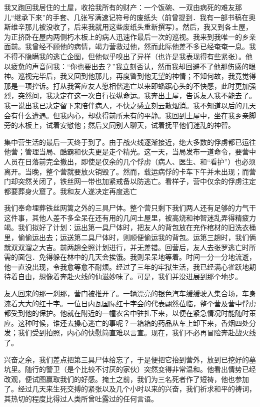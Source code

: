 \documentclass[11pt,oneside]{book}
\begin{document}
\begin{common-format}
我又跑回我居住的土屋，收拾我所有的财产：一个饭碗、一双由病死的难友那儿“继承下来”的手套、几张写满速记符号的废纸头（前曾提到．我有一部书稿在奥斯维辛那儿被没收了，后来我就用这些废纸头重新撰写）。然后，我又到各土屋，为正挤卧在屋内两侧朽木板上的病人迅速作最后一次的巡视。我来到我唯一的乡亲面前。我曾经不顾他的病情，竭力营救过他，然而此际他差不多已经奄奄一息。我不得不隐瞒我的逃亡企图，但他似乎嗅出了异样（也许是我表现得有些紧张）。他以疲惫的声音问我：“你也要出去？”我立刻否认，然而我却回避不了他那伤感的眼神。巡视完毕后，我又回到他那儿，再度瞥到他无望的神情；不知何故，我竟觉得那是一项控诉。打从我答应友人愿相偕逃亡以来即蟠踞心头的不快感，此时更加强烈，突然间，我决定在这一次自行操纵命运。我奔出土屋，告诉友人我不能去了。我一说出我已决定留下来陪伴病人，不快之感立刻云散烟消。我不知道以后的几天会有什么遭遇。但我内心，却获得前所未有的平静。我回到土屋中，坐在我乡亲脚旁的木板上，试着安慰他；然后又同别人聊天，试着抚平他们迷乱的神智。

集中营生活的最后一天终于到了。由于战火线逐渐接近，绝大多数的俘虏都已运往他营；管理当局、酷霸和伙夫更是走个精光。这一天，当局发布一道命令，要营中人员在日落前完全撤出，即使是仅余的几个俘虏（病人、医生、和“看护”）也必须离开。当晚，整个营就要放火销毁了。然而，载运病俘的卡车下午并未出现；而营门却突然关闭了，铁丝网一带也加紧戒备以防逃亡。看样子，营中仅余的俘虏注定都要葬身火窟了。我和友人遂决定再度逃亡

我们奉命埋葬铁丝网篱之外的三具尸体。整个营只剩下我们两人还有足够的力气干这件事，其他人差不多全呆在还有用的几间土屋里，被高烧和神智迷乱弄得精疲力竭。我们拟好了计划：运出第一具尸体时，把友人的背包放在充作棺材的旧洗衣桶里，偷偷运出去；运送第二具尸体时，则顺便偷运我的背包。运第三趟时，我们俩就双双溜之大吉。前两趟全照计划进行，并无差错。回营后，友人去张罗逃亡时所需的面包．免得躲在林中的几天会挨饿。我则呆呆地等着。时间一分一分地流逝，他一直没出现，令我愈等愈不耐烦。经过了三年的牢狱生活，我已经满心雀跃地期待着自由，想像着奔赴火线的仙滋妙味了。可是，我们并没进展到那个地步。

友人回来的那一刹那，营门被推开了。一辆漂亮的银色汽车缓缓驶入集合场，车身漆着大大的红十字。一位日内瓦国际红十字会的代表翩然莅临，整个营及营中俘虏都受到他的保护。他就在附近的一幢农舍中驻扎下来，以便在紧急情况时能随时策应。这种时候，谁还去操心逃亡的事呢？一箱箱的药品从车上卸下来，香烟四处分发；我们受到拍照，内心的快慰简直难以言宣。现在，我们不必再冒险奔赴战火线了。

兴奋之余，我们差点把第三具尸体给忘了，于是便把它抬到营外，放到已挖好的墓坑里。随行的警卫（是个比较不讨厌的家伙）突然变得非常温和。他看出情势已经改观，便试图赢取我们的好感。掩土之前，我们为三名死者作了短祷，他也参加了。经过几天来生死交搏的紧张以及几个小时以来的兴奋，我们祈求和平的祷词，其热切的程度比得过人类所曾吐露过的任何言语。


\end{common-format}
\end{document}
